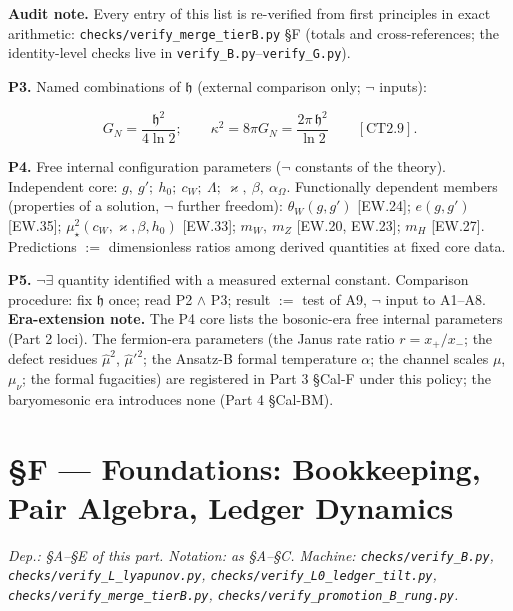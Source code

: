 \textbf{Audit note.} Every entry of this list is re-verified from first principles in exact arithmetic: \texttt{checks/\allowbreak{}verify\_\allowbreak{}merge\_\allowbreak{}tierB.py} §F (totals and cross-references; the identity-level checks live in \texttt{verify\_\allowbreak{}B.py}–\texttt{verify\_\allowbreak{}G.py}).

\label{tag:P3}
\textbf{P3.} Named combinations of $\mathfrak h$ (external comparison only; $\neg$ inputs):

\[
G_N=\frac{\mathfrak h^2}{4\ln2};\qquad
\kappa^2=8\pi G_N=\frac{2\pi\,\mathfrak h^2}{\ln2}\qquad[\mathrm{CT2.9}].
\]

\label{tag:P4}
\textbf{P4.} Free internal configuration parameters ($\neg$ constants of the theory). Independent core: $g,\ g';\ h_0;\ c_W;\ \Lambda;\ \varkappa,\ \beta,\ \alpha_\Omega$. Functionally dependent members (properties of a solution, $\neg$ further freedom): $\theta_W(g,g')$ [EW.24]; $e(g,g')$ [EW.35]; $\mu_\star^2(c_W,\varkappa,\beta,h_0)$ [EW.33]; $m_W,\ m_Z$ [EW.20, EW.23]; $m_H$ [EW.27]. Predictions $:=$ dimensionless ratios among derived quantities at fixed core data.

\label{tag:P5}
\textbf{P5.} $\neg\exists$ quantity identified with a measured external constant. Comparison procedure: fix $\mathfrak h$ once; read P2 $\wedge$ P3; result $:=$ test of A9, $\neg$ input to A1–A8. \textbf{Era-extension note.} The P4 core lists the bosonic-era free internal parameters (Part 2 loci). The fermion-era parameters (the Janus rate ratio $r=x_+/x_-$; the defect residues $\hat\mu^2$, $\hat\mu'^2$; the Ansatz-B formal temperature $\alpha$; the channel scales $\mu$, $\mu_\nu$; the formal fugacities) are registered in Part 3 §Cal-F under this policy; the baryomesonic era introduces none (Part 4 §Cal-BM).

\section[§F — Foundations: Bookkeeping, Pair Algebra, Ledger Dynamics]{\texorpdfstring{§F — Foundations: Bookkeeping, Pair Algebra, Ledger Dynamics}{SF - Foundations: Bookkeeping, Pair Algebra, Ledger Dynamics}}

\textit{Dep.: §A–§E of this part. Notation: as §A–§C. Machine: \texttt{checks/\allowbreak{}verify\_\allowbreak{}B.py}, \texttt{checks/\allowbreak{}verify\_\allowbreak{}L\_\allowbreak{}lyapunov.py}, \texttt{checks/\allowbreak{}verify\_\allowbreak{}L0\_\allowbreak{}ledger\_\allowbreak{}tilt.py}, \texttt{checks/\allowbreak{}verify\_\allowbreak{}merge\_\allowbreak{}tierB.py}, \texttt{checks/\allowbreak{}verify\_\allowbreak{}promotion\_\allowbreak{}B\_\allowbreak{}rung.py}.}

